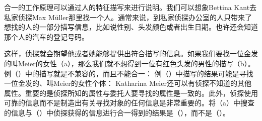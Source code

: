 合一的工作原理可以通过人的特征描写来进行说明。我们可以想象Bettina Kant去私家侦探Max Müller那里找一个人。通常来说，到私家侦探办公室的人只带来了想找的人的一部分描写信息，比如说性别、头发颜色或者出生日期。也许还会知道那个人的汽车的登记号码。

这样，侦探就会期望他或者她能够提供出符合描写的信息。如果我们要找一位金发的叫Meier的女性（a），那么我们就不想得到一位有红色头发的男性的描写（b）。例（）中的描写就是不兼容的，而且不能合一：
\eal
\ex\label{ex-meier-female-blonde}
\ex {}
\zl
例（）中描写的结果可能是寻找一位金发的、叫Meier的女性个体：
\ea
\label{info-detective}
\z
Katharina Meier还可以有侦探不知道的其他属性。重要的是侦探所知的属性与委托人要寻找的属性是一致的。此外，侦探使用可靠的信息而不是制造出有关寻找对象的任何信息是非常重要的。将（a）中搜查的信息与（）中侦探获得的信息进行合一得到的结果是（），而不是（）。
